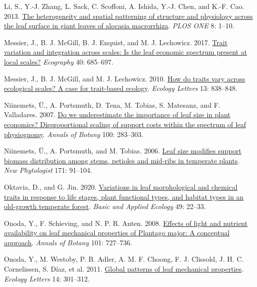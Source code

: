 \documentclass[
  12pt,
  a4paper,
,tablecaptionabove
]{scrartcl}
\newlength{\cslhangindent}
\newenvironment{CSLReferences}[2] %
 {%
  \setlength{\parindent}{0pt}
  \ifodd #1 \everypar{\setlength{\hangindent}{\cslhangindent}}\ignorespaces\fi
  \ifnum #2 > 0
  \setlength{\parskip}{#2\baselineskip}
  \fi
 }%
 {}
\begin{document}
\begin{CSLReferences}{1}{0}
\leavevmode{}%
Li, S., Y.-J. Zhang, L. Sack, C. Scoffoni, A. Ishida, Y.-J. Chen, and
K.-F. Cao. 2013. \href{https://doi.org/10.1371/journal.pone.0066016}{The
heterogeneity and spatial patterning of structure and physiology across
the leaf surface in giant leaves of alocasia macrorrhiza}. \emph{PLOS
ONE} 8: 1--10.

\leavevmode{}%
Messier, J., B. J. McGill, B. J. Enquist, and M. J. Lechowicz. 2017.
\href{https://doi.org/10.1111/ecog.02006}{Trait variation and
integration across scales: Is the leaf economic spectrum present at
local scales?} \emph{Ecography} 40: 685--697.

\leavevmode{}%
Messier, J., B. J. McGill, and M. J. Lechowicz. 2010.
\href{https://doi.org/10.1111/j.1461-0248.2010.01476.x}{How do traits
vary across ecological scales? {A} case for trait-based ecology}.
\emph{Ecology Letters} 13: 838--848.

\leavevmode{}%
Niinemets, Ü., A. Portsmuth, D. Tena, M. Tobias, S. Matesanz, and F.
Valladares. 2007. \href{https://doi.org/10.1093/aob/mcm107}{Do we
underestimate the importance of leaf size in plant economics?
{Disproportional} scaling of support costs within the spectrum of leaf
physiognomy}. \emph{Annals of Botany} 100: 283--303.

\leavevmode{}%
Niinemets, Ü., A. Portsmuth, and M. Tobias. 2006.
\href{https://doi.org/10.1111/j.1469-8137.2006.01741.x}{Leaf size
modifies support biomass distribution among stems, petioles and mid-ribs
in temperate plants}. \emph{New Phytologist} 171: 91--104.

\leavevmode{}%
Oktavia, D., and G. Jin. 2020.
\href{https://doi.org/10.1016/j.baae.2020.09.010}{Variations in leaf
morphological and chemical traits in response to life stages, plant
functional types, and habitat types in an old-growth temperate forest}.
\emph{Basic and Applied Ecology} 49: 22--33.

\leavevmode{}%
Onoda, Y., F. Schieving, and N. P. R. Anten. 2008.
\href{https://doi.org/10.1093/aob/mcn013}{Effects of light and nutrient
availability on leaf mechanical properties of {Plantago} major: {A}
conceptual approach}. \emph{Annals of Botany} 101: 727--736.

\leavevmode{}%
Onoda, Y., M. Westoby, P. B. Adler, A. M. F. Choong, F. J. Clissold, J.
H. C. Cornelissen, S. Díaz, et al. 2011.
\href{https://doi.org/10.1111/j.1461-0248.2010.01582.x}{Global patterns
of leaf mechanical properties}. \emph{Ecology Letters} 14: 301--312.


\end{CSLReferences}
\end{document}
